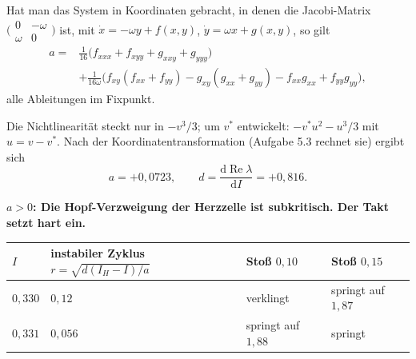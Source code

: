 \begin{merksatz}
Hat man das System in Koordinaten gebracht, in denen die Jacobi-Matrix $\bigl(\begin{smallmatrix}0&-\omega\\\omega&0\end{smallmatrix}\bigr)$ ist, mit $\dot x = -\omega y + f(x,y)$, $\dot y = \omega x + g(x,y)$, so gilt
\begin{align*} a = {} & \frac{1}{16}\big(f_{xxx} + f_{xyy} + g_{xxy} + g_{yyy}\big) \\ & + \frac{1}{16\omega}\big(f_{xy}(f_{xx}+f_{yy}) - g_{xy}(g_{xx}+g_{yy}) - f_{xx}g_{xx} + f_{yy}g_{yy}\big) , \end{align*}
alle Ableitungen im Fixpunkt.

Die Nichtlinearität steckt nur in $-v^{3}/3$; um $v^{*}$ entwickelt: $-v^{*}u^{2} - u^{3}/3$ mit $u = v - v^{*}$. Nach der Koordinatentransformation (Aufgabe 5.3 rechnet sie) ergibt sich
\[ a = +0{,}0723, \qquad d = \frac{\mathrm d\operatorname{Re}\lambda}{\mathrm dI} = +0{,}816 . \]

\begin{center}
\begin{minipage}{0.9\textwidth}
\textbf{$a > 0$: Die Hopf-Verzweigung der Herzzelle ist subkritisch. Der Takt setzt hart ein.}
\end{minipage}
\end{center}

\begin{center}
{\small
\renewcommand{\arraystretch}{1.48}
\begin{tabular}{@{}P{1.2cm}P{2.6cm}P{2.2cm}P{2.6cm}@{}}
\toprule
$I$ & \textbf{instabiler Zyklus} $r = \sqrt{d(I_H-I)/a}$ & \textbf{Stoß $0{,}10$} & \textbf{Stoß $0{,}15$}\\
\midrule
$0{,}330$ & $0{,}12$ & verklingt & springt auf $1{,}87$\\
$0{,}331$ & $0{,}056$ & springt auf $1{,}88$ & springt\\
\bottomrule
\end{tabular}}
\end{center}

\begin{center}
\begin{minipage}{0.88\textwidth}
\end{minipage}
\end{center}
\end{merksatz}

